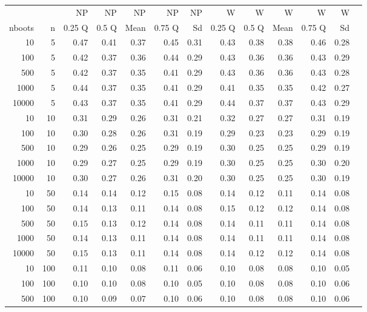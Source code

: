 \begin{table}[ht]
\footnotesize
\centering
\begin{tabular}{rrrrrrrrrrrrr}
  \hline
  & & NP & NP & NP & NP & NP & W & W & W & W & W \\
nboots & n & 0.25 Q & 0.5 Q & Mean & 0.75 Q & Sd & 0.25 Q & 0.5 Q & Mean & 0.75 Q & Sd \\ 
  \hline
10 & 5 & 0.47 & 0.41 & 0.37 & 0.45 & 0.31 & 0.43 & 0.38 & 0.38 & 0.46 & 0.28 \\ 
  100 & 5 & 0.42 & 0.37 & 0.36 & 0.44 & 0.29 & 0.43 & 0.36 & 0.36 & 0.43 & 0.29 \\ 
  500 & 5 & 0.42 & 0.37 & 0.35 & 0.41 & 0.29 & 0.43 & 0.36 & 0.36 & 0.43 & 0.28 \\ 
  1000 & 5 & 0.44 & 0.37 & 0.35 & 0.41 & 0.29 & 0.41 & 0.35 & 0.35 & 0.42 & 0.27 \\ 
  10000 & 5 & 0.43 & 0.37 & 0.35 & 0.41 & 0.29 & 0.44 & 0.37 & 0.37 & 0.43 & 0.29 \\ 
  10 & 10 & 0.31 & 0.29 & 0.26 & 0.31 & 0.21 & 0.32 & 0.27 & 0.27 & 0.31 & 0.19 \\ 
  100 & 10 & 0.30 & 0.28 & 0.26 & 0.31 & 0.19 & 0.29 & 0.23 & 0.23 & 0.29 & 0.19 \\ 
  500 & 10 & 0.29 & 0.26 & 0.25 & 0.29 & 0.19 & 0.30 & 0.25 & 0.25 & 0.29 & 0.19 \\ 
  1000 & 10 & 0.29 & 0.27 & 0.25 & 0.29 & 0.19 & 0.30 & 0.25 & 0.25 & 0.30 & 0.20 \\ 
  10000 & 10 & 0.30 & 0.27 & 0.26 & 0.31 & 0.20 & 0.30 & 0.25 & 0.25 & 0.30 & 0.19 \\ 
  10 & 50 & 0.14 & 0.14 & 0.12 & 0.15 & 0.08 & 0.14 & 0.12 & 0.11 & 0.14 & 0.08 \\ 
  100 & 50 & 0.14 & 0.13 & 0.11 & 0.14 & 0.08 & 0.15 & 0.12 & 0.12 & 0.14 & 0.08 \\ 
  500 & 50 & 0.15 & 0.13 & 0.12 & 0.14 & 0.08 & 0.14 & 0.11 & 0.11 & 0.14 & 0.08 \\ 
  1000 & 50 & 0.14 & 0.13 & 0.11 & 0.14 & 0.08 & 0.14 & 0.11 & 0.11 & 0.14 & 0.08 \\ 
  10000 & 50 & 0.15 & 0.13 & 0.11 & 0.14 & 0.08 & 0.14 & 0.12 & 0.12 & 0.14 & 0.08 \\ 
  10 & 100 & 0.11 & 0.10 & 0.08 & 0.11 & 0.06 & 0.10 & 0.08 & 0.08 & 0.10 & 0.05 \\ 
  100 & 100 & 0.10 & 0.10 & 0.08 & 0.10 & 0.05 & 0.10 & 0.08 & 0.08 & 0.10 & 0.06 \\ 
  500 & 100 & 0.10 & 0.09 & 0.07 & 0.10 & 0.06 & 0.10 & 0.08 & 0.08 & 0.10 & 0.06 \\ 

\end{tabular}
\end{table}
